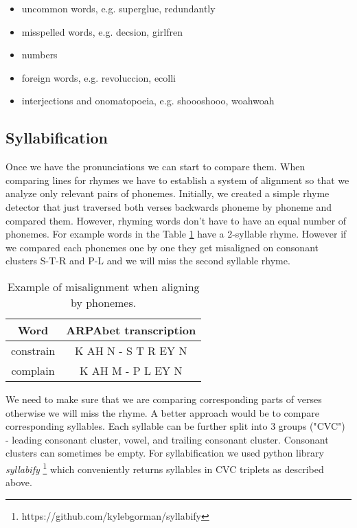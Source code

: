 \begin{itemize}
	\item uncommon words, e.g. superglue, redundantly
	\item misspelled words, e.g. decsion, girlfren
	\item numbers
	\item foreign words, e.g. revoluccion, ecolli
	\item interjections and onomatopoeia, e.g. shoooshooo, woahwoah
\end{itemize}


\subsection{Syllabification}
Once we have the pronunciations we can start to compare them. When comparing lines for rhymes we have to establish a system of alignment so that we analyze only relevant pairs of phonemes. Initially, we created a simple rhyme detector that just traversed both verses backwards phoneme by phoneme and compared them. However, rhyming words don't have to have an equal number of phonemes. For example words in the Table \ref{phon_misalign_table} have a 2-syllable rhyme. However if we compared each phonemes one by one they get misaligned on consonant clusters S-T-R and P-L and we will miss the second syllable rhyme.

\begin{table}[h!]
	\centering
	\begin{tabular}{c c} 
		Word & ARPAbet transcription \\ [0.5ex] 
		\hline
		constrain & K AH N - S T R EY N \\ 
		complain & K AH M - P L EY N \\
	\end{tabular}
	\caption{Example of misalignment when aligning by phonemes.}
	\label{phon_misalign_table}
\end{table}

We need to make sure that we are comparing corresponding parts of verses otherwise we will miss the rhyme. A better approach would be to compare corresponding syllables. Each syllable can be further split into 3 groups ("CVC") - leading consonant cluster, vowel, and trailing consonant cluster. Consonant clusters can sometimes be empty. For syllabification we used python library \textit{syllabify} \footnote{https://github.com/kylebgorman/syllabify} which conveniently returns syllables in CVC triplets as described above.


